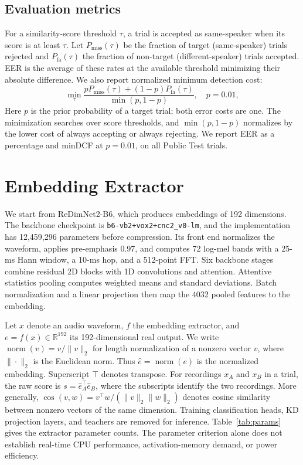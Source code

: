 \documentclass[11pt]{article}
\newcommand{\ltn}{\operatorname{norm}}
\begin{document}
\subsection{Evaluation metrics}
For a similarity-score threshold $\tau$, a trial is accepted as same-speaker when its score is at least $\tau$. Let $P_{\mathrm{miss}}(\tau)$ be the fraction of target (same-speaker) trials rejected and $P_{\mathrm{fa}}(\tau)$ the fraction of non-target (different-speaker) trials accepted. EER is the average of these rates at the available threshold minimizing their absolute difference. We also report normalized minimum detection cost:
\begin{equation}
 \min_\tau\frac{pP_{\mathrm{miss}}(\tau)+(1-p)P_{\mathrm{fa}}(\tau)}{\min(p,1-p)},\quad p=0.01,
\end{equation}
Here $p$ is the prior probability of a target trial; both error costs are one. The minimization searches over score thresholds, and $\min(p,1-p)$ normalizes by the lower cost of always accepting or always rejecting. We report EER as a percentage and minDCF at $p=0.01$, on all Public Test trials.

\section{Embedding Extractor}
\label{sec:model}
We start from ReDimNet2-B6, which produces embeddings of 192 dimensions. The backbone checkpoint is \nolinkurl{b6-vb2+vox2+cnc2_v0-lm}, and the implementation has 12,459,296 parameters before compression. Its front end normalizes the waveform, applies pre-emphasis 0.97, and computes 72 log-mel bands with a 25-ms Hann window, a 10-ms hop, and a 512-point FFT. Six backbone stages combine residual 2D blocks with 1D convolutions and attention. Attentive statistics pooling computes weighted means and standard deviations. Batch normalization and a linear projection then map the 4032 pooled features to the embedding.

Let $x$ denote an audio waveform, $f$ the embedding extractor, and $e=f(x)\in\mathbb R^{192}$ its 192-dimensional real output. We write $\ltn(v)=v/\|v\|_2$ for length normalization of a nonzero vector $v$, where $\|\cdot\|_2$ is the Euclidean norm. Thus $\hat e=\ltn(e)$ is the normalized embedding. Superscript $\top$ denotes transpose. For recordings $x_A$ and $x_B$ in a trial, the raw score is $s=\hat e_A^\top\hat e_B$, where the subscripts identify the two recordings. More generally, $\cos(v,w)=v^\top w/(\|v\|_2\|w\|_2)$ denotes cosine similarity between nonzero vectors of the same dimension. Training classification heads, KD projection layers, and teachers are removed for inference. Table~\ref{tab:params} gives the extractor parameter counts. The parameter criterion alone does not establish real-time CPU performance, activation-memory demand, or power efficiency.
\end{document}
